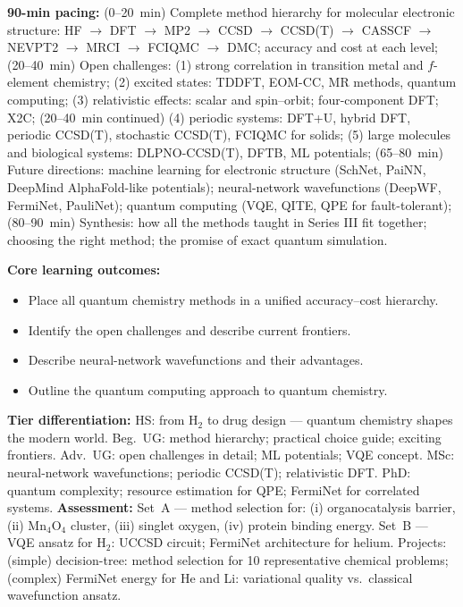 \documentclass[11pt,a4paper]{article}
\begin{document}
\medskip

\begin{tcolorbox}[chembox, title={Module~III.3 --- Lecture L12: Synthesis and Outlook}]
\textbf{90-min pacing:} (0--20~min) Complete method hierarchy for molecular electronic structure: HF $\to$ DFT $\to$ MP2 $\to$ CCSD $\to$ CCSD(T) $\to$ CASSCF $\to$ NEVPT2 $\to$ MRCI $\to$ FCIQMC $\to$ DMC; accuracy and cost at each level; (20--40~min) Open challenges: (1) strong correlation in transition metal and $f$-element chemistry; (2) excited states: TDDFT, EOM-CC, MR methods, quantum computing; (3) relativistic effects: scalar and spin--orbit; four-component DFT; X2C; (20--40~min continued) (4) periodic systems: DFT+U, hybrid DFT, periodic CCSD(T), stochastic CCSD(T), FCIQMC for solids; (5) large molecules and biological systems: DLPNO-CCSD(T), DFTB, ML potentials; (65--80~min) Future directions: machine learning for electronic structure (SchNet, PaiNN, DeepMind AlphaFold-like potentials); neural-network wavefunctions (DeepWF, FermiNet, PauliNet); quantum computing (VQE, QITE, QPE for fault-tolerant); (80--90~min) Synthesis: how all the methods taught in Series III fit together; choosing the right method; the promise of exact quantum simulation.

\medskip\textbf{Core learning outcomes:}
\begin{itemize}[leftmargin=1.4em,topsep=2pt,itemsep=1pt]
  \item Place all quantum chemistry methods in a unified accuracy--cost hierarchy.
  \item Identify the open challenges and describe current frontiers.
  \item Describe neural-network wavefunctions and their advantages.
  \item Outline the quantum computing approach to quantum chemistry.
\end{itemize}
\medskip\textbf{Tier differentiation:}
HS: from H$_2$ to drug design --- quantum chemistry shapes the modern world.
Beg.\ UG: method hierarchy; practical choice guide; exciting frontiers.
Adv.\ UG: open challenges in detail; ML potentials; VQE concept.
MSc: neural-network wavefunctions; periodic CCSD(T); relativistic DFT.
PhD: quantum complexity; resource estimation for QPE; FermiNet for correlated systems.
\medskip\textbf{Assessment:}
Set~A --- method selection for: (i) organocatalysis barrier, (ii) Mn$_4$O$_4$ cluster, (iii) singlet oxygen, (iv) protein binding energy.
Set~B --- VQE ansatz for H$_2$: UCCSD circuit; FermiNet architecture for helium.
Projects: (simple) decision-tree: method selection for 10 representative chemical problems; (complex) FermiNet energy for He and Li: variational quality vs.\ classical wavefunction ansatz.
\end{tcolorbox}
\end{document}
